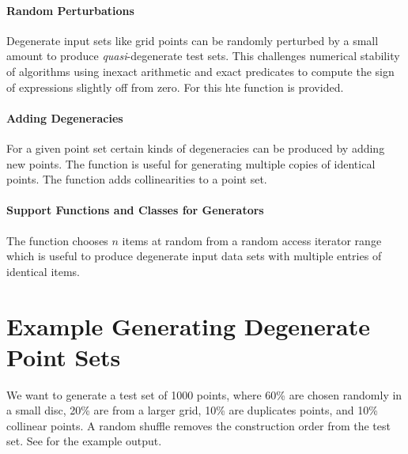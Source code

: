 \paragraph{Random Perturbations}

Degenerate input sets like grid points can be randomly perturbed by a
small amount to produce {\em quasi}-degenerate test sets. This
challenges numerical stability of algorithms using inexact arithmetic and
exact predicates to compute the sign of expressions slightly off from zero.
For this hte function  is provided.

\paragraph{Adding Degeneracies}
\ccModifierCrossRefOff
{}
\ccModifierCrossRefOn

For a given point set certain kinds of degeneracies can be produced
by adding new points. The  function is
useful for generating multiple copies of identical points.
The function  adds collinearities to
a point set.

\paragraph{Support Functions and Classes for Generators}

The function  chooses $n$ items at random from a random
access iterator range which is useful to produce degenerate input data
sets with multiple entries of identical items.

\section{Example Generating Degenerate Point Sets}

We want to generate a test set of 1000 points, where 60\% are chosen
randomly in a small disc, 20\% are from a larger grid, 10\% are duplicates
points, and 10\% collinear points. A random shuffle removes the
construction order from the test set. See  for the example output.


